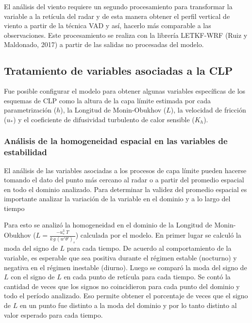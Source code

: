 \documentclass[12pt,spanish,oneside, a4paper]{book}
\begin{document}
El análisis del viento requiere un segundo procesamiento para
transformar la variable a la retícula del radar y de esta manera obtener
el perfil vertical de viento a partir de la técnica VAD y así, hacerlo
más comparable a las observaciones. Este procesamiento se realiza con la
librería LETKF-WRF (Ruiz y Maldonado, 2017) a partir de las salidas no
procesadas del modelo.

\subsection{Tratamiento de variables asociadas a la
CLP}\label{tratamiento-de-variables-asociadas-a-la-clp}

Fue posible configurar el modelo para obtener algunas variables
específicas de los esquemas de CLP como la altura de la capa límite
estimada por cada parametrización (\(h\)), la Longitud de Monin-Obukhov
(\(L\)), la velocidad de fricción (\(u_*\)) y el coeficiente de
difusividad turbulento de calor sensible (\(K_h\)).

\subsubsection{Análisis de la homogeneidad espacial en las variables de
estabilidad}\label{analisis-de-la-homogeneidad-espacial-en-las-variables-de-estabilidad}

El análisis de las variables asociadas a los procesos de capa límite
pueden hacerse tomando el dato del punto más cercano al radar o a partir
del promedio espacial en todo el dominio analizado. Para determinar la
validez del promedio espacial es importante analizar la variación de la
variable en el dominio y a lo largo del tiempo

Para esto se analizó la homogeneidad en el dominio de la Longitud de
Monin-Obukhov (\(L = \frac{-u_*^3 \;T}{k \, g \, (w'\theta ')_s}\))
calculada por el modelo. En primer lugar se calculó la moda del signo de
\(L\) para cada tiempo. De acuerdo al comportamiento de la variable, es
esperable que sea positiva durante el régimen estable (nocturno) y
negativa en el régimen inestable (diurno). Luego se comparó la moda del
signo de \(L\) con el signo de \(L\) en cada punto de retícula para cada
tiempo. Se contó la cantidad de veces que los signos no coincidieron
para cada punto del dominio y todo el período analizado. Eso permite
obtener el porcentaje de veces que el signo de \(L\) en un punto fue
distinto a la moda del dominio y por lo tanto distinto al valor esperado
para cada tiempo.
\end{document}

